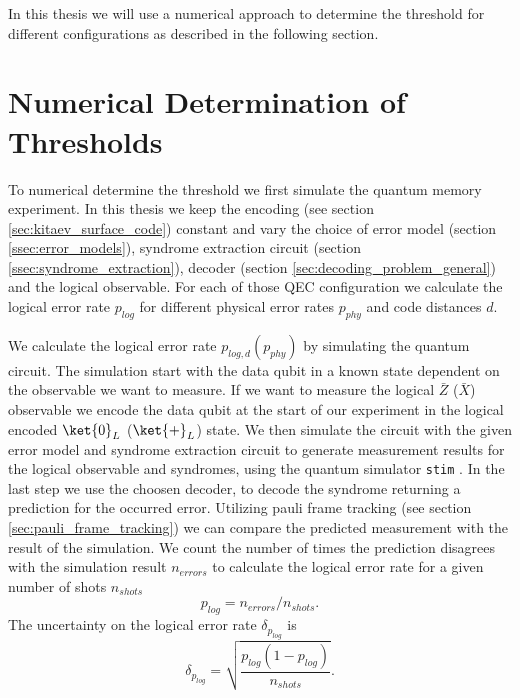 In this thesis we will use a numerical approach to determine the threshold for different configurations as described in the following section.

\section{Numerical Determination of Thresholds}

To numerical determine the threshold we first simulate the quantum memory experiment.
In this thesis we keep the encoding (see section \ref{sec:kitaev_surface_code}) constant 
and vary the choice of error model (section \ref{ssec:error_models}), syndrome extraction circuit (section \ref{ssec:syndrome_extraction}), decoder (section \ref{sec:decoding_problem_general}) and the logical observable.
For each of those QEC configuration we calculate the logical error rate $p_{log}$ for different physical error rates $p_{phy}$ and code distances $d$.

We calculate the logical error rate $p_{log,d}(p_{phy})$ by simulating the quantum circuit.
The simulation start with the data qubit in a known state dependent on the observable we want to measure.
If we want to measure the logical $\bar{Z}$ ($\bar{X}$) observable we encode the data qubit at the start of our experiment in the logical encoded $\ket{0}_L$  ($\ket{+}_L$) state.
We then simulate the circuit with the given error model and syndrome extraction circuit to generate measurement results for the logical observable and syndromes, using the quantum simulator \texttt{stim} \cite{stim}.
In the last step we use the choosen decoder, to decode the syndrome returning a prediction for the occurred error.
Utilizing pauli frame tracking (see section \ref{sec:pauli_frame_tracking}) we can compare the predicted measurement with the result of the simulation. 
We count the number of times the prediction disagrees with the simulation result $n_{errors}$ to calculate the logical error rate for a given number of shots $n_{shots}$ 
\begin{equation}
    p_{log} = n_{errors}/n_{shots}.
\end{equation}
The uncertainty on the logical error rate $\delta_{p_{log}}$ is 
\begin{equation}
    \delta_{p_{log}} = \sqrt{\frac{p_{log}(1-p_{log})}{n_{shots}}}.
\end{equation}

